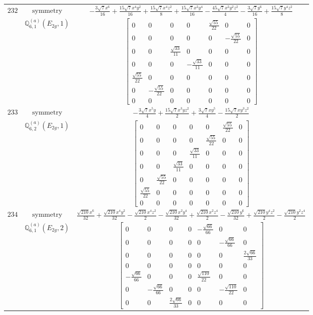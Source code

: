 \documentclass[fleqn,8pt,landscape]{jsarticle}
\begin{document}
\begin{longtable}{ccc}
$ 232 $ & $ \text{symmetry} $ & $ - \frac{3 \sqrt{7} x^{6}}{16} + \frac{15 \sqrt{7} x^{4} y^{2}}{16} + \frac{15 \sqrt{7} x^{4} z^{2}}{8} + \frac{15 \sqrt{7} x^{2} y^{4}}{16} - \frac{45 \sqrt{7} x^{2} y^{2} z^{2}}{4} - \frac{3 \sqrt{7} y^{6}}{16} + \frac{15 \sqrt{7} y^{4} z^{2}}{8} $ \\
$  $ & $ \mathbb{Q}_{6,1}^{(a)}(E_{2g},1) $ & $ \begin{bmatrix} 0 & 0 & 0 & 0 & \frac{\sqrt{55}}{22} & 0 & 0 \\ 0 & 0 & 0 & 0 & 0 & - \frac{\sqrt{55}}{22} & 0 \\ 0 & 0 & \frac{\sqrt{33}}{11} & 0 & 0 & 0 & 0 \\ 0 & 0 & 0 & - \frac{\sqrt{33}}{11} & 0 & 0 & 0 \\ \frac{\sqrt{55}}{22} & 0 & 0 & 0 & 0 & 0 & 0 \\ 0 & - \frac{\sqrt{55}}{22} & 0 & 0 & 0 & 0 & 0 \\ 0 & 0 & 0 & 0 & 0 & 0 & 0 \end{bmatrix} $ \\ \hline
$ 233 $ & $ \text{symmetry} $ & $ - \frac{3 \sqrt{7} x^{5} y}{4} + \frac{15 \sqrt{7} x^{3} y z^{2}}{2} + \frac{3 \sqrt{7} x y^{5}}{4} - \frac{15 \sqrt{7} x y^{3} z^{2}}{2} $ \\
$  $ & $ \mathbb{Q}_{6,2}^{(a)}(E_{2g},1) $ & $ \begin{bmatrix} 0 & 0 & 0 & 0 & 0 & \frac{\sqrt{55}}{22} & 0 \\ 0 & 0 & 0 & 0 & \frac{\sqrt{55}}{22} & 0 & 0 \\ 0 & 0 & 0 & \frac{\sqrt{33}}{11} & 0 & 0 & 0 \\ 0 & 0 & \frac{\sqrt{33}}{11} & 0 & 0 & 0 & 0 \\ 0 & \frac{\sqrt{55}}{22} & 0 & 0 & 0 & 0 & 0 \\ \frac{\sqrt{55}}{22} & 0 & 0 & 0 & 0 & 0 & 0 \\ 0 & 0 & 0 & 0 & 0 & 0 & 0 \end{bmatrix} $ \\ \hline
$ 234 $ & $ \text{symmetry} $ & $ \frac{\sqrt{210} x^{6}}{32} + \frac{\sqrt{210} x^{4} y^{2}}{32} - \frac{\sqrt{210} x^{4} z^{2}}{2} - \frac{\sqrt{210} x^{2} y^{4}}{32} + \frac{\sqrt{210} x^{2} z^{4}}{2} - \frac{\sqrt{210} y^{6}}{32} + \frac{\sqrt{210} y^{4} z^{2}}{2} - \frac{\sqrt{210} y^{2} z^{4}}{2} $ \\
$  $ & $ \mathbb{Q}_{6,1}^{(a)}(E_{2g},2) $ & $ \begin{bmatrix} 0 & 0 & 0 & 0 & - \frac{\sqrt{66}}{66} & 0 & 0 \\ 0 & 0 & 0 & 0 & 0 & - \frac{\sqrt{66}}{66} & 0 \\ 0 & 0 & 0 & 0 & 0 & 0 & \frac{2 \sqrt{66}}{33} \\ 0 & 0 & 0 & 0 & 0 & 0 & 0 \\ - \frac{\sqrt{66}}{66} & 0 & 0 & 0 & \frac{\sqrt{110}}{22} & 0 & 0 \\ 0 & - \frac{\sqrt{66}}{66} & 0 & 0 & 0 & - \frac{\sqrt{110}}{22} & 0 \\ 0 & 0 & \frac{2 \sqrt{66}}{33} & 0 & 0 & 0 & 0 \end{bmatrix} $ \\ \hline

\end{longtable}
\end{document}
